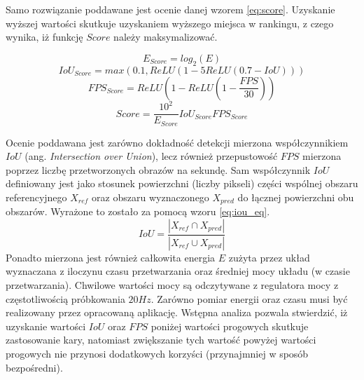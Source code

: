 Samo rozwiązanie poddawane jest ocenie danej wzorem \eqref{eq:score}. Uzyskanie wyższej wartości skutkuje uzyskaniem wyższego miejsca w rankingu, z czego wynika, iż funkcję $Score$ należy maksymalizować. 

\begin{equation}
E_{Score} = log_2(E)
\label{eq:e_score}
\end{equation}
\begin{equation}
IoU_{Score} = max(0.1, ReLU(1 - 5 ReLU(0.7 - IoU)))
\label{eq:iou_score}
\end{equation}
\begin{equation}
FPS_{Score} = ReLU(1 - ReLU( 1 - \frac{FPS}{30}))
\label{eq:fps_score}
\end{equation}
\begin{equation}
Score = \frac{10^2}{E_{Score}} IoU_{Score} FPS_{Score}
\label{eq:score}
\end{equation}

Ocenie poddawana jest zarówno dokładność detekcji mierzona współczynnikiem $IoU$ (ang. \emph{Intersection over Union}), lecz również przepustowość $FPS$ mierzona poprzez liczbę przetworzonych obrazów na sekundę.
Sam współczynnik $IoU$ definiowany jest jako stosunek powierzchni (liczby pikseli) części wspólnej obszaru referencyjnego $X_{ref}$ oraz obszaru wyznaczonego $X_{pred}$ do łącznej powierzchni obu obszarów. Wyrażone to zostało za pomocą wzoru \eqref{eq:iou_eq}.
\begin{equation}
IoU = \frac{|X_{ref} \cap X_{pred}|}{|X_{ref} \cup X_{pred}|}
\label{eq:iou_eq}
\end{equation}
Ponadto mierzona jest również całkowita energia $E$ zużyta przez układ 
wyznaczana z iloczynu czasu przetwarzania oraz średniej mocy układu (w czasie przetwarzania). 
Chwilowe wartości mocy są odczytywane z regulatora mocy z częstotliwością próbkowania $20 Hz$.
Zarówno pomiar energii oraz czasu musi być realizowany przez opracowaną aplikację.
Wstępna analiza pozwala stwierdzić, iż uzyskanie wartości $IoU$ oraz $FPS$ poniżej wartości progowych skutkuje zastosowanie kary, natomiast
zwiększanie tych wartość powyżej wartości progowych nie przynosi dodatkowych korzyści (przynajmniej w sposób bezpośredni). 


